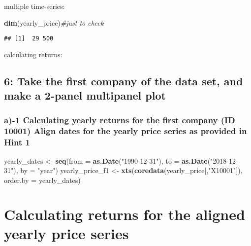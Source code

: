 \documentclass[
]{article}
\newenvironment{Shaded}{\begin{snugshade}}{\end{snugshade}}
\newcommand{\AttributeTok}[1]{\textcolor[rgb]{0.13,0.29,0.53}{#1}}
\newcommand{\CommentTok}[1]{\textcolor[rgb]{0.56,0.35,0.01}{\textit{#1}}}
\newcommand{\FunctionTok}[1]{\textcolor[rgb]{0.13,0.29,0.53}{\textbf{#1}}}
\newcommand{\NormalTok}[1]{#1}
\newcommand{\OtherTok}[1]{\textcolor[rgb]{0.56,0.35,0.01}{#1}}
\newcommand{\StringTok}[1]{\textcolor[rgb]{0.31,0.60,0.02}{#1}}
\begin{document}
multiple time-series:

\begin{Shaded}
\begin{Highlighting}[]
\FunctionTok{dim}\NormalTok{(yearly\_price)}\CommentTok{\#just to check }
\end{Highlighting}
\end{Shaded}

\begin{verbatim}
## [1]  29 500
\end{verbatim}

calculating returns:

\subsection{6: Take the first company of the data set, and make a
2-panel multipanel
plot}\label{take-the-first-company-of-the-data-set-and-make-a-2-panel-multipanel-plot}

\subsubsection{a)-1 Calculating yearly returns for the first company (ID
10001) Align dates for the yearly price series as provided in Hint
1}\label{a-1-calculating-yearly-returns-for-the-first-company-id-10001-align-dates-for-the-yearly-price-series-as-provided-in-hint-1}

\begin{Shaded}
\begin{Highlighting}[]
\NormalTok{yearly\_dates }\OtherTok{\textless{}{-}} \FunctionTok{seq}\NormalTok{(}\AttributeTok{from =} \FunctionTok{as.Date}\NormalTok{(}\StringTok{"1990{-}12{-}31"}\NormalTok{), }\AttributeTok{to =} \FunctionTok{as.Date}\NormalTok{(}\StringTok{"2018{-}12{-}31"}\NormalTok{), }\AttributeTok{by =} \StringTok{"year"}\NormalTok{)}
\NormalTok{yearly\_price\_f1 }\OtherTok{\textless{}{-}} \FunctionTok{xts}\NormalTok{(}\FunctionTok{coredata}\NormalTok{(yearly\_price[,}\StringTok{"X10001"}\NormalTok{]), }\AttributeTok{order.by =}\NormalTok{ yearly\_dates)}
\end{Highlighting}
\end{Shaded}

\section{Calculating returns for the aligned yearly price
series}\label{calculating-returns-for-the-aligned-yearly-price-series}
\end{document}

